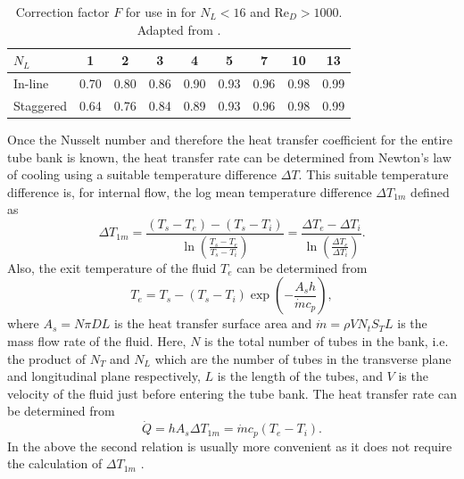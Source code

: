 \begin{table}[htbp]
  \centering
  \caption{Correction factor $F$ for use in  for $N_L<16$ and
    $\mathrm{Re}_D>1000$. Adapted from  .}
  \label{tab:tube-bank-correction-factor}
  \begin{tabular}{@{}l*{8}{c}@{}}
    \toprule
    $N_L$ & \num{1}  & \num{2}  & \num{3}  & \num{4}  & \num{5}  & \num{7}  & \num{10}  & \num{13}  \\
    \midrule
    In-line   & \num{0,70}  & \num{0,80}  & \num{0,86}  & \num{0,90}  & \num{0,93}  & \num{0,96}  & \num{0,98}  & \num{0,99}  \\
    Staggered & \num{0,64}  & \num{0,76}  & \num{0,84}  & \num{0,89}  & \num{0,93}  & \num{0,96}  & \num{0,98}  & \num{0,99}  \\
    \bottomrule
  \end{tabular}
\end{table}

Once the Nusselt number and therefore the heat transfer coefficient for the entire tube bank is known, the heat transfer rate can be determined from Newton's law of cooling using a suitable temperature difference $\Delta T$.
This suitable temperature difference is, for internal flow, the log mean temperature difference $\Delta T_{1m}$ defined as 
\begin{equation*}
  \Delta T_{1m} = \frac{\left( T_s - T_e \right) - \left( T_s - T_i \right)}{\ln \left( \frac{T_s - T_e}{T_s - T_i} \right)} = \frac{\Delta T_e - \Delta T_i}{\ln \left( \frac{\Delta T_e}{\Delta T_i} \right)}
.\end{equation*}
Also, the exit temperature of the fluid $T_e$ can be determined from 
\begin{equation*}
  T_e = T_s - \left( T_s - T_i \right) \exp \left( - \frac{A_s h}{\dot{m} c_p} \right)
,\end{equation*}
where $A_s = N \pi D L$ is the heat transfer surface area and $\dot{m} = \rho V N_t S_T L$ is the mass flow rate of the fluid.
Here, $N$ is the total number of tubes in the bank, i.e. the product of $N_T$ and $N_L$ which are the number of tubes in the transverse plane and longitudinal plane respectively, $L$ is the length of the tubes, and $V$ is the velocity of the fluid just before entering the tube bank.
The heat transfer rate can be determined from 
\begin{equation*}
  \dot{Q} = h A_s \Delta T_{1m} = \dot{m} c_p \left( T_e - T_i \right)
.\end{equation*}
In the above the second relation is usually more convenient as it does not require the calculation of $\Delta T_{1m}$ .
